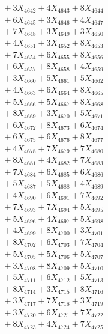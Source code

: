 \documentclass[a4paper,10pt]{article}
\begin{document}
{\begin{align}
&\;  + 3 X_{4642} + 4 X_{4643} + 8 X_{4644} \\[0.3ex]
&\;  + 6 X_{4645} + 3 X_{4646} + 4 X_{4647} \\[0.3ex]
&\;  + 7 X_{4648} + 3 X_{4649} + 3 X_{4650} \\[0.3ex]
&\;  + 4 X_{4651} + 3 X_{4652} + 8 X_{4653} \\[0.3ex]
&\;  + 7 X_{4654} + 6 X_{4655} + 8 X_{4656} \\[0.3ex]
&\;  + 6 X_{4657} + 8 X_{4658} + 4 X_{4659} \\[0.5ex]\allowbreak
&\;  + 3 X_{4660} + 5 X_{4661} + 5 X_{4662} \\[0.3ex]
&\;  + 4 X_{4663} + 6 X_{4664} + 8 X_{4665} \\[0.3ex]
&\;  + 5 X_{4666} + 5 X_{4667} + 8 X_{4668} \\[0.3ex]
&\;  + 8 X_{4669} + 3 X_{4670} + 5 X_{4671} \\[0.3ex]
&\;  + 6 X_{4672} + 8 X_{4673} + 6 X_{4674} \\[0.3ex]
&\;  + 6 X_{4675} + 6 X_{4676} + 8 X_{4677} \\[0.3ex]
&\;  + 4 X_{4678} + 7 X_{4679} + 7 X_{4680} \\[0.3ex]
&\;  + 8 X_{4681} + 4 X_{4682} + 7 X_{4683} \\[0.3ex]
&\;  + 7 X_{4684} + 6 X_{4685} + 6 X_{4686} \\[0.3ex]
&\;  + 5 X_{4687} + 5 X_{4688} + 4 X_{4689} \\[0.5ex]\allowbreak
&\;  + 4 X_{4690} + 6 X_{4691} + 7 X_{4692} \\[0.3ex]
&\;  + 7 X_{4693} + 7 X_{4694} + 5 X_{4695} \\[0.3ex]
&\;  + 5 X_{4696} + 4 X_{4697} + 5 X_{4698} \\[0.3ex]
&\;  + 4 X_{4699} + 8 X_{4700} + 3 X_{4701} \\[0.3ex]
&\;  + 8 X_{4702} + 6 X_{4703} + 7 X_{4704} \\[0.3ex]
&\;  + 5 X_{4705} + 5 X_{4706} + 5 X_{4707} \\[0.3ex]
&\;  + 3 X_{4708} + 8 X_{4709} + 5 X_{4710} \\[0.3ex]
&\;  + 5 X_{4711} + 6 X_{4712} + 5 X_{4713} \\[0.3ex]
&\;  + 8 X_{4714} + 3 X_{4715} + 8 X_{4716} \\[0.3ex]
&\;  + 3 X_{4717} + 7 X_{4718} + 3 X_{4719} \\[0.5ex]\allowbreak
&\;  + 3 X_{4720} + 6 X_{4721} + 7 X_{4722} \\[0.3ex]
&\;  + 8 X_{4723} + 4 X_{4724} + 7 X_{4725} \\[0.3ex]

\end{align}}
\end{document}
